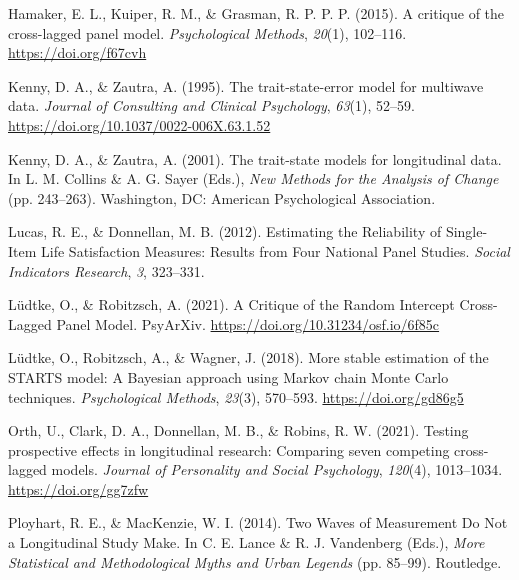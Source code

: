\documentclass[
  english,
  man,floatsintext]{apa6}
\newlength{\cslhangindent}
\newlength{\cslentryspacingunit} %
\newenvironment{CSLReferences}[2] %
 {%
  \setlength{\parindent}{0pt}
  \ifodd #1
  \let\oldpar\par
  \def\par{\hangindent=\cslhangindent\oldpar}
  \fi
  \setlength{\parskip}{#2\cslentryspacingunit}
 }%
 {}
\begin{document}
\begin{CSLReferences}{1}{0}
\leavevmode{}%
Hamaker, E. L., Kuiper, R. M., \& Grasman, R. P. P. P. (2015). A critique of the cross-lagged panel model. \emph{Psychological Methods}, \emph{20}(1), 102--116. \url{https://doi.org/f67cvh}

\leavevmode{}%
Kenny, D. A., \& Zautra, A. (1995). The trait-state-error model for multiwave data. \emph{Journal of Consulting and Clinical Psychology}, \emph{63}(1), 52--59. \url{https://doi.org/10.1037/0022-006X.63.1.52}

\leavevmode{}%
Kenny, D. A., \& Zautra, A. (2001). The trait-state models for longitudinal data. In L. M. Collins \& A. G. Sayer (Eds.), \emph{New {Methods} for the {Analysis} of {Change}} (pp. 243--263). {Washington, DC}: {American Psychological Association}.

\leavevmode{}%
Lucas, R. E., \& Donnellan, M. B. (2012). Estimating the {Reliability} of {Single-Item Life Satisfaction Measures}: {Results} from {Four National Panel Studies}. \emph{Social Indicators Research}, \emph{3}, 323--331.

\leavevmode{}%
Lüdtke, O., \& Robitzsch, A. (2021). A {Critique} of the {Random Intercept Cross-Lagged Panel Model}. {PsyArXiv}. \url{https://doi.org/10.31234/osf.io/6f85c}

\leavevmode{}%
Lüdtke, O., Robitzsch, A., \& Wagner, J. (2018). More stable estimation of the {STARTS} model: {A Bayesian} approach using {Markov} chain {Monte Carlo} techniques. \emph{Psychological Methods}, \emph{23}(3), 570--593. \url{https://doi.org/gd86g5}

\leavevmode{}%
Orth, U., Clark, D. A., Donnellan, M. B., \& Robins, R. W. (2021). Testing prospective effects in longitudinal research: {Comparing} seven competing cross-lagged models. \emph{Journal of Personality and Social Psychology}, \emph{120}(4), 1013--1034. \url{https://doi.org/gg7zfw}

\leavevmode{}%
Ployhart, R. E., \& MacKenzie, W. I. (2014). Two {Waves} of {Measurement Do Not} a {Longitudinal Study Make}. In C. E. Lance \& R. J. Vandenberg (Eds.), \emph{More {Statistical} and {Methodological Myths} and {Urban Legends}} (pp. 85--99). {Routledge}.


\end{CSLReferences}
\end{document}
